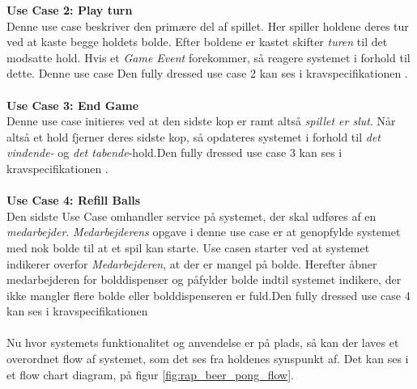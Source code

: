 \documentclass[Rapport/Rapport_main.tex]{subfiles}
\begin{document}
\textbf{Use Case 2: Play turn}\\
Denne use case beskriver den primære del af spillet. Her spiller holdene  deres tur ved at kaste begge holdets bolde.  Efter boldene er kastet skifter \textit{turen} til det modsatte hold. Hvis et \textit{Game Event} forekommer, så reagere systemet i forhold til dette. Denne use case 
Den fully dressed use case 2 kan ses i kravspecifikationen .\\\\
\textbf{Use Case 3: End Game}\\
Denne use case initieres ved at den sidste kop er ramt altså \textit{spillet er slut}. Når altså et hold fjerner deres sidste kop, så opdateres systemet i forhold til \textit{det vindende-} og \textit{det tabende}-hold.Den fully dressed use case 3 kan ses i kravspecifikationen .\\\\
\textbf{Use Case 4: Refill Balls}\\
Den sidste Use Case omhandler service på systemet, der skal udføres af en \textit{medarbejder}. \textit{Medarbejderens} opgave i denne use case er at genopfylde systemet med nok bolde til at et spil kan starte. Use casen starter ved at systemet indikerer overfor \textit{Medarbejderen}, at der er mangel på bolde. Herefter åbner medarbejderen for bolddispenser og påfylder bolde indtil systemet indikere, der ikke mangler flere bolde eller bolddispenseren er fuld.Den fully dressed use case 4 kan ses i kravspecifikationen \\\\
Nu hvor systemets funktionalitet og anvendelse er på plads, så kan der laves et overordnet flow af systemet, som det ses fra holdenes synspunkt af. Det kan ses i et flow chart diagram, på figur \ref{fig:rap_beer_pong_flow}.
\end{document}
